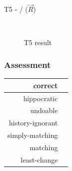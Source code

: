 \documentclass{article}
\newcommand{\cmark}{\ding{51}}%
\begin{document}
T5 -  /  ($\overrightarrow{R}$)
\begin{figure}[ht]
    \centering
    \mbox{\quad\qquad\quad
          }
    \caption{T5 result}
    \label{fig:T5}
\end{figure}
\subsubsection{Assessment}

\begin{center}
\begin{tabular}{| r | c |}
  \hline                        
  correct & \cmark\\
  \hline
  hippocratic & \cmark\\
  \hline 
  undoable & \cmark\\
  \hline 
  history-ignorant & \cmark\\
  \hline 
  simply-matching & \cmark\\
  \hline 
  matching & \cmark\\
  \hline 
  least-change & \cmark\\
  \hline   
\end{tabular}
\end{center}
\end{document}
